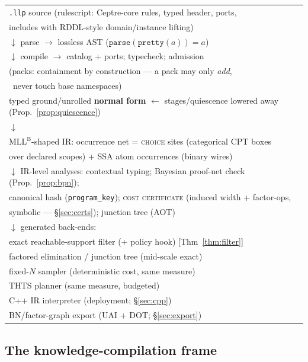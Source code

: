 \documentclass[11pt]{article}
\newcommand{\mllb}{\mathrm{MLL}^{\mathrm B}}
\theoremstyle{plain}
\theoremstyle{definition}
\theoremstyle{remark}
\begin{document}
\begin{center}\small
\begin{tabular}{l}
\texttt{.llp} source (rulescript: Ceptre-core rules, typed header,
ports,\\
\quad includes with RDDL-style domain/instance lifting)\\
\quad $\downarrow$ parse $\to$ lossless AST
($\texttt{parse}(\texttt{pretty}(a)) = a$)\\
\quad $\downarrow$ compile $\to$ catalog + ports; typecheck; admission\\
\qquad (packs: containment by construction --- a pack may only
\emph{add},\\
\qquad\ never touch base namespaces)\\
typed ground/unrolled \textbf{normal form} \quad $\leftarrow$
stages/quiescence lowered away (Prop.~\ref{prop:quiescence})\\
\quad $\downarrow$\\
$\mllb$-shaped IR: occurrence net = \textsc{choice} sites (categorical
CPT boxes\\
\quad over declared scopes) + SSA atom occurrences (binary wires)\\
\quad $\downarrow$ IR-level analyses: contextual typing; Bayesian
proof-net check (Prop.~\ref{prop:bpn});\\
\qquad canonical hash (\texttt{program\_key}); \textsc{cost
certificate} (induced width + factor-ops,\\
\qquad symbolic --- \S\ref{sec:certs}); junction tree (AOT)\\
\quad $\downarrow$ generated back-ends:\\
\qquad exact reachable-support filter (+ policy hook) \hfill
[Thm~\ref{thm:filter}]\\
\qquad factored elimination / junction tree (mid-scale exact)\\
\qquad fixed-$N$ sampler (deterministic cost, same measure)\\
\qquad THTS planner (same measure, budgeted)\\
\qquad C++ IR interpreter (deployment; \S\ref{sec:cpp})\\
\qquad BN/factor-graph export (UAI + DOT; \S\ref{sec:export})\\
\end{tabular}
\end{center}

\subsection{The knowledge-compilation frame}
\end{document}
